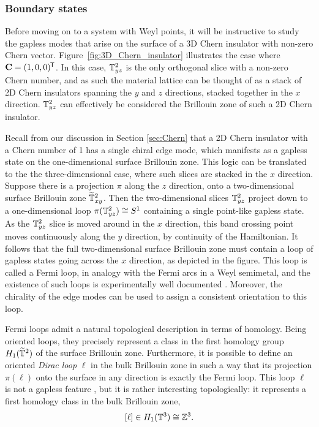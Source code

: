 \subsubsection{Boundary states}

Before moving on to a system with Weyl points, it will be instructive to study the gapless modes that arise on the surface of a 3D Chern insulator with non-zero Chern vector. Figure~\ref{fig:3D_Chern_insulator} illustrates the case where $\vb{C} = (1,0,0)^{\mkern-1.5mu\mathsf{T}}$. In this case, $\mathbb{T}_{yz}^2$ is the only orthogonal slice with a non-zero Chern number, and as such the material lattice can be thought of as a stack of 2D Chern insulators spanning the $y$ and $z$ directions, stacked together in the $x$ direction. $\mathbb{T}_{yz}^2$ can effectively be considered the Brillouin zone of such a 2D Chern insulator.

Recall from our discussion in Section \ref{sec:Chern} that a 2D Chern insulator with a Chern number of 1 has a single chiral edge mode, which manifests as a gapless state on the one-dimensional surface Brillouin zone. %
This logic can be translated to the the three-dimensional case, where such slices are stacked in the $x$ direction. Suppose there is a projection $\pi$ along the $z$ direction, onto a two-dimensional surface Brillouin zone $\widetilde{\mathbb{T}}_{xy}^2$. Then the two-dimensional slices $\mathbb{T}_{yz}^2$ project down to a one-dimensional loop $\pi(\mathbb{T}_{yz}^2)\cong S^1$ containing a single point-like gapless state. As the $\mathbb{T}_{yz}^2$ slice is moved around in the $x$ direction, this band crossing point moves continuously along the $y$ direction, by continuity of the Hamiltonian. It follows that the full two-dimensional surface Brillouin zone must contain a loop of gapless states going across the $x$ direction, as depicted in the figure. This loop is called a Fermi loop, in analogy with the Fermi arcs in a Weyl semimetal, and the existence of such loops is experimentally well documented \red{[references]}. %
Moreover, the chirality of the edge modes can be used to assign a consistent orientation to this loop. %

Fermi loops admit a natural topological description in terms of homology. Being oriented loops, they precisely represent a class in the first homology group $H_1(\widetilde{\mathbb{T}}^2)$ of the surface Brillouin zone. Furthermore, it is possible to define an oriented \emph{Dirac loop}  %
$\ell$ in the bulk Brillouin zone in such a way that its projection $\pi(\ell)$ onto the surface in any direction is exactly the Fermi loop. This loop $\ell$ is not a gapless feature , %
but it is rather interesting topologically: it represents a first homology class in the bulk Brillouin zone,
\[
	[\ell]\in H_1(\mathbb{T}^3)\cong\mathbb{Z}^3.
\]

